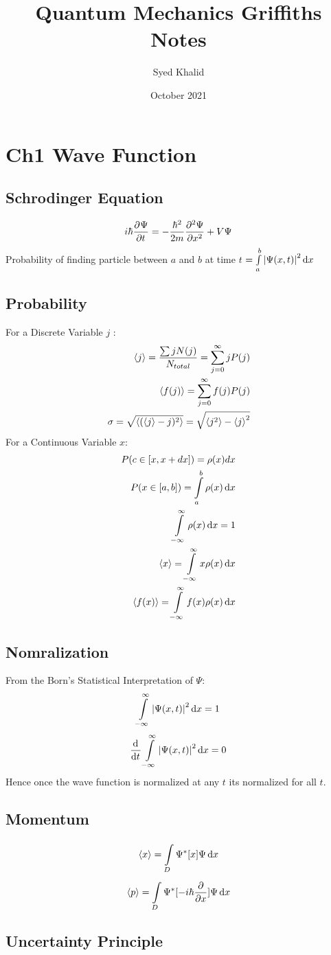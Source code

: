 \documentclass{article}
\title{\bf{Quantum Mechanics Griffiths Notes}}
\author{Syed Khalid}
\date{October 2021}
\newcommand{\s}[2]{\sum_{#1}^{#2}}
\renewcommand{\i}[4]{\int\limits_{#3}^{#4}{#1}\,\mathrm{d}{#2}}
\renewcommand{\P}{\Psi}
\newcommand{\Pxt}{\Psi(x,t)}
\begin{document}
 
\maketitle 
\section{Ch1 Wave Function}
\subsection{Schrodinger Equation}
$$i\hbar\pdv[]{\P}{t}=-\frac{\hbar^2}{2m}\pdv[2]{\P}{x}+V\P$$
Probability of finding particle between $a$ and $b$ at time $t$
$=\i{\abs{\Pxt}^2}{x}{a}{b}$

\subsection{Probability}

For a Discrete Variable $j$ :
\begin{align*}
\ev{j}=\frac{\sum jN(j)}{N_{total}}
=\s{j=0}{\infty}jP(j) \\
\ev{f(j)}=\s{j=0}{\infty}f(j)P(j)\\
\sigma=\sqrt{\ev{(\ev{j}-j)^2}}=\sqrt{\ev{j^2}-\ev{j}^2}
\end{align*}
For a Continuous Variable $x$:
\begin{align*}
    P(c\in[x,x+dx])=\rho(x)dx\\
    P(x\in[a,b])=\i{\rho(x)}{x}{a}{b}\\
    \i{\rho(x)}{x}{-\infty}{\infty}=1\\
    \ev{x}=\i{x\rho(x)}{x}{-\infty}{\infty}\\
    \ev{f(x)}=\i{f(x)\rho(x)}{x}{-\infty}{\infty}
\end{align*}
\subsection{Nomralization}

From the Born's Statistical Interpretation of $\P$:
$$\i{\abs{\Pxt}^2}{x}{-\infty}{\infty}=1$$
$$\dv[]{}{t}\i{\abs{\Pxt}^2}{x}{-\infty}{\infty}=0$$
Hence once the wave function is normalized at any $t$ its normalized for all $t$.
\subsection{Momentum}
$$\ev{x}=\i{\P^*[x]\P}{x}{D}{}$$
$$\ev{p}=\i{\P^*[-i\hbar\pdv{}{x}]\P}{x}{D}{}$$
\subsection{Uncertainty Principle}
\end{document}
